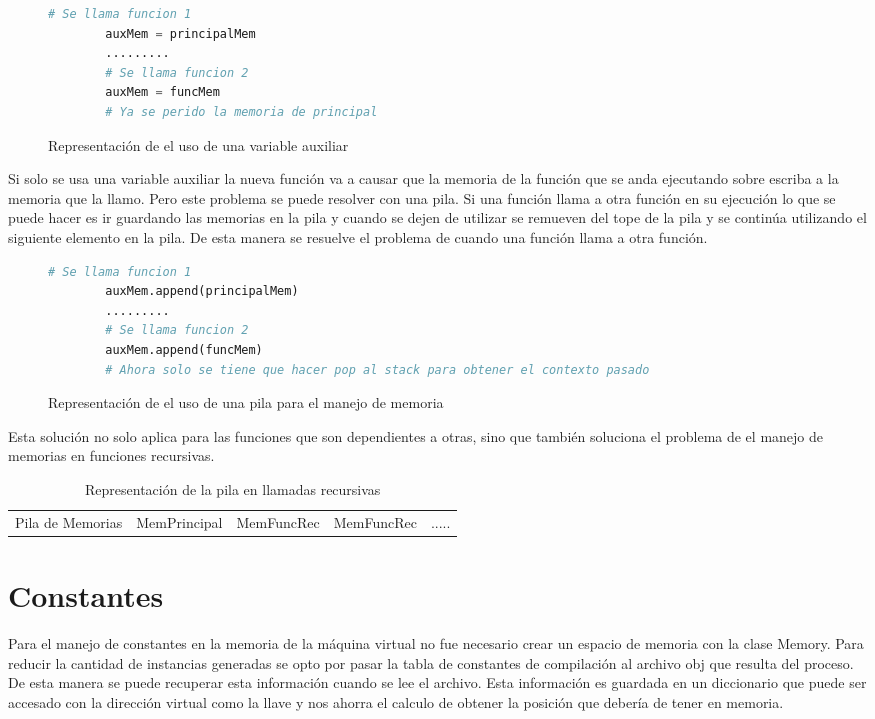 \begin{figure}[htbp]
    \centering
    \begin{lstlisting}[language = Python]
        # Se llama funcion 1
        auxMem = principalMem
        .........
        # Se llama funcion 2
        auxMem = funcMem
        # Ya se perido la memoria de principal 
    \end{lstlisting}
    \caption{Representación de el uso de una variable auxiliar}
    \label{fig:my_label}
\end{figure}
\FloatBarrier
Si solo se usa una variable auxiliar la nueva función va a causar que la memoria de la función que se anda ejecutando sobre escriba a la memoria que la llamo. Pero este problema se puede resolver con una pila. Si una función llama a otra función en su ejecución lo que se puede hacer es ir guardando las memorias en la pila y cuando se dejen de utilizar se remueven del tope de la pila y se continúa utilizando el siguiente elemento en la pila. De esta manera se resuelve el problema de cuando una función llama a otra función.
\begin{figure}[htbp]
    \centering
    \begin{lstlisting}[language = Python]
        # Se llama funcion 1
        auxMem.append(principalMem)
        .........
        # Se llama funcion 2
        auxMem.append(funcMem)
        # Ahora solo se tiene que hacer pop al stack para obtener el contexto pasado
    \end{lstlisting}
    \caption{Representación de el uso de una pila para el manejo de memoria}
    \label{fig:my_label}
\end{figure}
\FloatBarrier
Esta solución no solo aplica para las funciones que son dependientes a otras, sino que también soluciona el problema de el manejo de memorias en funciones recursivas.

\begin{table}[htbp]
    \centering
    \begin{tabular}{c|c c c c}
       
        Pila de Memorias & MemPrincipal & MemFuncRec & MemFuncRec & ..... \\
         
    \end{tabular}
    \caption{Representación de la pila en llamadas recursivas}
    \label{tab:my_label}
\end{table}

\section{Constantes}

Para el manejo de constantes en la memoria de la máquina virtual no fue necesario crear un espacio de memoria con la clase Memory. Para reducir la cantidad de instancias generadas se opto por pasar la tabla de constantes de compilación al archivo obj que resulta del proceso. De esta manera se puede recuperar esta información cuando se lee el archivo.  Esta información es guardada en un diccionario que puede ser accesado con la dirección virtual como la llave y nos ahorra el calculo de obtener la posición que debería de tener en memoria.